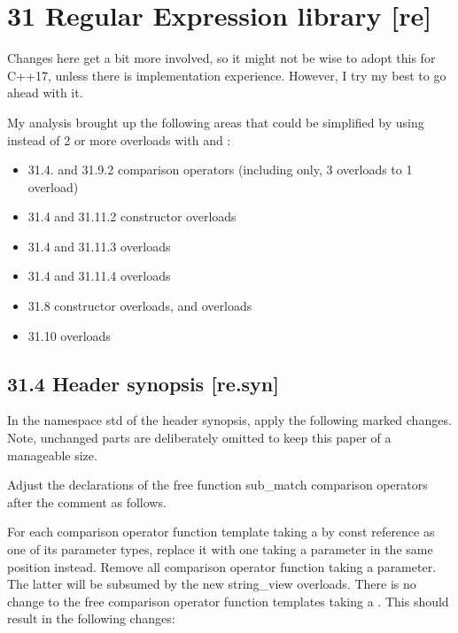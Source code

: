 \documentclass[ebook,11pt,article]{memoir}
\begin{document}
\section{ 31 Regular Expression library  [re]}%
Changes here get a bit more involved, so it might not be wise to adopt this for C++17, unless there is implementation experience. However, I try my best to go ahead with it. 

My analysis brought up the following areas that could be simplified by using  instead of 2 or more overloads with  and :
\begin{itemize}
\item 31.4. and 31.9.2  comparison operators (including  only, 3 overloads to 1 overload)
\item 31.4 and 31.11.2  constructor overloads
\item 31.4 and 31.11.3  overloads
\item 31.4 and 31.11.4  overloads
\item 31.8  constructor overloads,  and  overloads
\item 31.10  overloads
\end{itemize}


\subsection{31.4 Header  synopsis [re.syn]}
In the namespace std of the header synopsis, apply the following marked changes. Note, unchanged parts are deliberately omitted to keep this paper of a manageable size.

Adjust the declarations of the free function sub_match comparison operators after the comment  as follows.

For each comparison operator function template taking a  by const reference as one of its parameter types, replace it with one taking a  parameter in the same position instead. Remove all comparison operator function taking a  parameter. The latter will be subsumed by the new string_view overloads. There is no change to the free comparison operator function templates taking a . This should result in the following changes:
\end{document}
